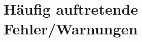 \documentclass[12pt]{article}
\begin{document}
\part{Häufig auftretende Fehler/Warnungen}

\clearpage
\frontmatter%
\renewcommand{\plaintitle}{Literaturverzeichnis}
\setcounter{page}{5}
\printMyBibliography
\end{document}
